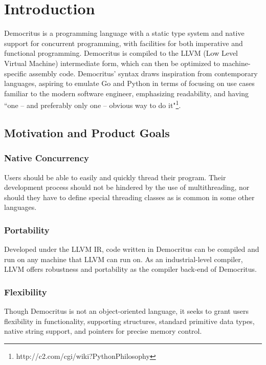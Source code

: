 \chapter{Introduction}

Democritus is a programming language with a static type system and native support for concurrent programming, with facilities for both imperative and functional programming. Democritus is compiled to the LLVM (Low Level Virtual Machine) intermediate form, which can then be optimized to machine-specific assembly code. Democritus' syntax draws inspiration from contemporary languages, aspiring to emulate Go and Python in terms of focusing on use cases familiar to the modern software engineer, emphasizing readability, and having ``one -- and preferably only one -- obvious way to do it"\footnote[1]{http://c2.com/cgi/wiki?PythonPhilosophy}.


\section{Motivation and Product Goals}

	\subsection{Native Concurrency}
		Users should be able to easily and quickly thread their program. Their development process should not be hindered by the use of multithreading, nor should they have to define special threading classes as is common in some other languages.

	\subsection{Portability}
		Developed under the LLVM IR, code written in Democritus can be compiled and run on any machine that LLVM can run on. As an industrial-level compiler, LLVM offers robustness and portability as the compiler back-end of Democritus. 

	\subsection{Flexibility}
		Though Democritus is not an object-oriented language, it seeks to grant users flexibility in functionality, supporting structures, standard primitive data types, native string support, and pointers for precise memory control. 
